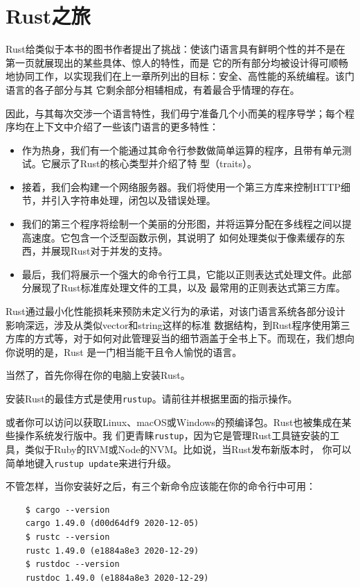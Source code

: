 \chapter{Rust之旅}\label{CHP2}

Rust给类似于本书的图书作者提出了挑战：使该门语言具有鲜明个性的并不是在第一页就展现出的某些具体、惊人的特性，而是
它的所有部分均被设计得可顺畅地协同工作，以实现我们在上一章所列出的目标：安全、高性能的系统编程。该门语言的各子部分与其
它剩余部分相辅相成，有着最合乎情理的存在。

\medskip
因此，与其每次交涉一个语言特性，我们毋宁准备几个小而美的程序导学；每个程序均在上下文中介绍了一些该门语言的更多特性：

\smallskip
\begin{itemize}
    \item 作为热身，我们有一个能通过其命令行参数做简单运算的程序，且带有单元测试。它展示了Rust的核心类型并介绍了特
    型（traits）。 
    \item 接着，我们会构建一个网络服务器。我们将使用一个第三方库来控制HTTP细节，并引入字符串处理，闭包以及错误处理。
    \item 我们的第三个程序将绘制一个美丽的分形图，并将运算分配在多线程之间以提高速度。它包含一个泛型函数示例，其说明了
    如何处理类似于像素缓存的东西，并展现Rust对于并发的支持。
    \item 最后，我们将展示一个强大的命令行工具，它能以正则表达式处理文件。此部分展现了Rust标准库处理文件的工具，以及
    最常用的正则表达式第三方库。
\end{itemize}

\smallskip
Rust通过最小化性能损耗来预防未定义行为的承诺，对该门语言系统各部分设计影响深远，涉及从类似vector和string这样的标准
数据结构，到Rust程序使用第三方库的方式等，对于如何对此管理妥当的细节涵盖于全书上下。而现在，我们想向你说明的是，Rust
是一门相当能干且令人愉悦的语言。

\medskip
当然了，首先你得在你的电脑上安装Rust。

\bigskip
{}
安装Rust的最佳方式是使用\texttt{rustup}。请前往并根据里面的指示操作。

\medskip
或者你可以访问以获取Linux、macOS或Windows的预编译包。Rust也被集成在某些操作系统发行版中。我
们更青睐\texttt{rustup}，因为它是管理Rust工具链安装的工具，类似于Ruby的RVM或Node的NVM。比如说，当Rust发布新版本时，
你可以简单地键入\texttt{rustup update}来进行升级。

\medskip
不管怎样，当你安装好之后，有三个新命令应该能在你的命令行中可用：
\begin{verbatim}
    $ cargo --version
    cargo 1.49.0 (d00d64df9 2020-12-05)
    $ rustc --version
    rustc 1.49.0 (e1884a8e3 2020-12-29)
    $ rustdoc --version
    rustdoc 1.49.0 (e1884a8e3 2020-12-29)
\end{verbatim}

